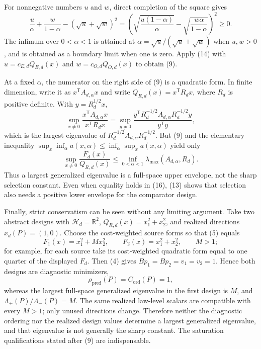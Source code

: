 For nonnegative numbers \(u\) and \(w\), direct completion of the square gives
\[
 \frac{u}{\alpha}+\frac{w}{1-\alpha}
 -(\sqrt u+\sqrt w)^2
 =\left(
 \sqrt{\frac{u(1-\alpha)}{\alpha}}
 -\sqrt{\frac{w\alpha}{1-\alpha}}
 \right)^2\ge0.
 \tag{14}
\]
The infimum over \(0<\alpha<1\) is attained at
\(\alpha=\sqrt u/(\sqrt u+\sqrt w)\) when \(u,w>0\), and is obtained as a boundary limit when one is zero.  Apply (14) with
\(u=c_{E,d}Q_{E,d}(x)\) and
\(w=c_{O,d}Q_{O,d}(x)\) to obtain (9).

At a fixed \(\alpha\), the numerator on the right side of (9) is a quadratic form.  In finite dimension, write it as \(x^{\mathsf T}A_{d,\alpha}x\) and write \(Q_{R,d}(x)=x^{\mathsf T}R_dx\), where \(R_d\) is positive definite.  With \(y=R_d^{1/2}x\),
\[
 \sup_{x\ne0}
 \frac{x^{\mathsf T}A_{d,\alpha}x}{x^{\mathsf T}R_dx}
 =\sup_{y\ne0}
 \frac{y^{\mathsf T}R_d^{-1/2}A_{d,\alpha}R_d^{-1/2}y}{y^{\mathsf T}y},
 \tag{15}
\]
which is the largest eigenvalue of
\(R_d^{-1/2}A_{d,\alpha}R_d^{-1/2}\).  But (9) and the elementary inequality
\(\sup_x\inf_\alpha a(x,\alpha)\le\inf_\alpha\sup_x a(x,\alpha)\) yield only
\[
 \sup_{x\ne0}\frac{F_d(x)}{Q_{R,d}(x)}
 \le
 \inf_{0<\alpha<1}
 \lambda_{\max}(A_{d,\alpha},R_d).
 \tag{16}
\]
Thus a largest generalized eigenvalue is a full-space upper envelope, not the sharp selection constant.  Even when equality holds in (16), (13) shows that selection also needs a positive lower envelope for the comparator design.

Finally, strict conservatism can be seen without any limiting argument.  Take two abstract designs with \(\mathcal H_d=\mathbb R^2\), \(Q_{R,d}(x)=x_1^2+x_2^2\), and realized directions \(x_d(P)=(1,0)\).  Choose the cost-weighted source forms so that (5) equals
\[
 F_1(x)=x_1^2+Mx_2^2,
 \qquad
 F_2(x)=x_1^2+x_2^2,
 \qquad M>1;
 \tag{17}
\]
for example, for each source take its cost-weighted quadratic form equal to one quarter of the displayed \(F_d\).  Then (4) gives
\(Bp_1=Bp_2=v_1=v_2=1\).  Hence both designs are diagnostic minimizers,
\[
 \rho_{\mathrm{pred}}(P)=C_{\mathrm{ord}}(P)=1,
\]
whereas the largest full-space generalized eigenvalue in the first design is \(M\), and \(\Lambda_+(P)/\Lambda_-(P)=M\).  The same realized law-level scalars are compatible with every \(M>1\); only unused directions change.  Therefore neither the diagnostic ordering nor the realized design values determine a largest generalized eigenvalue, and that eigenvalue is not generally the sharp constant.  The saturation qualifications stated after (9) are indispensable.